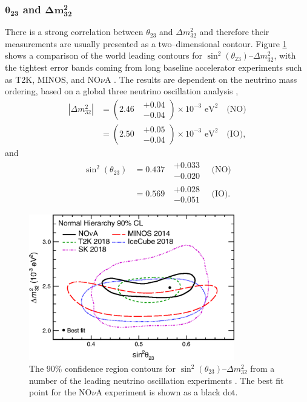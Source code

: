 {\subsubsection*{$\boldsymbol{\theta_{23}}$ and $\boldsymbol{\Delta m^2_{32}}$}
There is a strong correlation between $\theta_{23}$ and $\Delta m^2_{32}$ and
therefore their measurements are usually presented as a two--dimensional
contour. Figure \ref{fig:delm_sin23} shows a comparison of the world leading
contours for $\sin^2 (\theta_{23})$--$\Delta m^2_{32}$, with the tightest error
bands coming from long baseline accelerator experiments such as T2K, MINOS, and 
NO$\nu$A \cite{PhysRevD.96.092006, PhysRevLett.112.191801,
PhysRevLett.123.151803}. The results are dependent on the neutrino mass
ordering, based on a global three neutrino oscillation analysis 
\cite{Capozzi:2016rtj, TODO}, 
\begin{align}
	\label{eqn:delta_m_32}
	|\Delta m^2_{32}| &= (2.46 \mbox{ } \substack{+ 0.04 \\ - 0.04}) \times 10^{-3} \mbox{  eV}^2 \quad \mbox{(NO)} \\
	                  &= (2.50 \mbox{ } \substack{+ 0.05 \\ - 0.04}) \times 10^{-3} \mbox{  eV}^2 \quad \mbox{(IO)},
\end{align}
and 
\begin{align}
	\label{eqn:delta_m_32}
	\sin^2(\theta_{23}) &= 0.437 \mbox{  } \substack{+ 0.033 \\ - 0.020} \quad \mbox{(NO)} \\
	                    &= 0.569 \mbox{  } \substack{+ 0.028 \\ - 0.051} \quad \mbox{(IO)}.
\end{align}
\begin{figure}
	\centering
	\includegraphics[width=0.8\textwidth]{figures/theta23_msquare.png}
	\caption{The 90\% confidence region contours for 
	$\sin^2 (\theta_{23})$--$\Delta m^2_{32}$ from a number of the leading 
	neutrino oscillation experiments \cite{TODO}. The best fit point for the 
	NO$\nu$A experiment is shown as a black dot. \cite{PhysRevLett.123.151803}}
	\label{fig:delm_sin23}
\end{figure}

}
